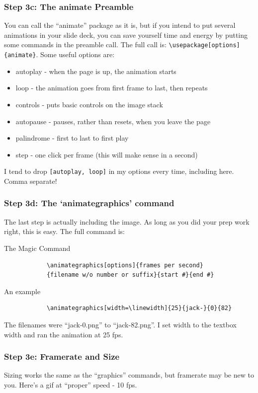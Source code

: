 \documentclass{beamer}
\begin{document}
\begin{frame}[fragile]
	\frametitle{Step 3c: The animate Preamble}
	You can call the ``animate'' package as it is, but if you intend to put several animations in your slide deck, you can save yourself time and energy by putting some commands in the preamble call. The full call is: \verb+\usepackage[options]{animate}+. Some useful options are:
		\begin{itemize}
			\item autoplay - when the page is up, the animation starts
			\item loop - the animation goes from first frame to last, then repeats
			\item controls - puts basic controls on the image stack
			\item autopause - pauses, rather than resets, when you leave the page
			\item palindrome - first to last to first play
			\item step - one click per frame (this will make sense in a second)
		\end{itemize}
	I tend to drop \verb+[autoplay, loop]+ in my options every time, including here. Comma separate!
\end{frame}

\begin{frame}[fragile]
	\frametitle{Step 3d: The `animategraphics' command}
	The last step is actually including the image. As long as you did your prep work right, this is easy. The full command is:
		\begin{block}{The Magic Command}
			\begin{verbatim}
			\animategraphics[options]{frames per second}
			{filename w/o number or suffix}{start #}{end #}
			\end{verbatim}
		\end{block}
		\begin{block}{An example}
			\begin{verbatim}
			\animategraphics[width=\linewidth]{25}{jack-}{0}{82}
			\end{verbatim}
			The filenames were ``jack-0.png'' to ``jack-82.png''. I set width to the textbox width and ran the animation at 25 fps.
		\end{block}
\end{frame}

\begin{frame}
	\frametitle{Step 3e: Framerate and Size}
	Sizing works the same as the ``graphics'' commands, but framerate may be new to you. Here's a gif at ``proper'' speed - 10 fps.
		\begin{center}
		\end{center}
\end{frame}
\end{document}
